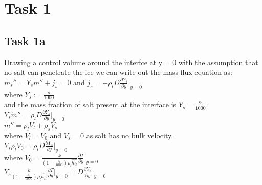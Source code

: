 \begin{comment}
	\documentclass[letterpaper, 10pt]{article}
	\usepackage{ucs}
	\usepackage[utf8x]{inputenc}
	\usepackage[english]{babel}
	\usepackage[T1]{fontenc}
	\usepackage{lmodern, textcomp}
	\usepackage{tikz, pgf, pgfplots, pgffor}
	\usepgflibrary{plothandlers}
	\pgfplotsset{plot coordinates/math parser=true}
	\pgfplotsset{compat=newest}
	\usetikzlibrary{plotmarks}
	\usepackage{graphicx, epsfig}
	\usepackage{amsmath, amssymb, graphics, setspace, units, fancyvrb, hyperref}	
\end{comment}

% 
	
	\section*{Task 1} %
	\label{sec:Task 1}
	
	\subsection*{Task 1a} %
	\label{ssec:Task 1a}
	Drawing a control volume around the interfce at y = 0 with the assumption that no salt can penetrate the ice we can write out the mass flux equation as:\\ 
	$\dot{m}_s'' = Y_s \dot{m}'' + j_s = 0$ and $j_s = -\rho_l D \frac{\partial Y_s}{\partial y}\big|_{y=0}$\\ 
	where $Y_s := \frac{s}{1000}$\\ 
	and the mass fraction of salt present at the interface is $Y_s = \frac{s_0}{1000}$.\\
		
	\noindent $Y_s \dot{m}'' = \rho_l D \frac{\partial Y_s}{\partial y}\big|_{y=0}$\\
	\noindent $\dot{m}'' = \rho_l V_l + \rho_s V_s$\\
	where $V_l = V_0$ and $V_s = 0$ as salt has no bulk velocity.\\
	
	\noindent $Y_s \rho_l V_0 = \rho_l D \frac{\partial Y_s}{\partial y}\big|_{y=0}$\\
	
	\noindent where $V_0 = \frac{k}{\left(1-\frac{s_0}{1000}\right)\rho_l \hat{h_{il}}} \frac{\partial T}{\partial y}\big|_{y=0}$\\
	
	\noindent $Y_s  \frac{k}{\left(1-\frac{s_0}{1000}\right)\rho_l \hat{h_{il}}} \frac{\partial T}{\partial y}\big|_{y=0} = D  \frac{\partial Y_s}{\partial y}\big|_{y=0}$\\
	
